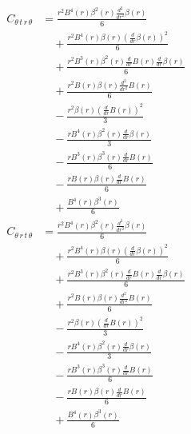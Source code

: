 \documentclass[11pt,a4paper]{article}
\begin{document}
\begin{align*}
  C_{\theta\,t\,r\,\theta} &= \frac{r^{2} B^{4}{\left(r \right)} \beta^{2}{\left(r \right)} \frac{d^{2}}{d r^{2}} \beta{\left(r \right)}}{6} \\
  &\quad + \frac{r^{2} B^{4}{\left(r \right)} \beta{\left(r \right)} \left(\frac{d}{d r} \beta{\left(r \right)}\right)^{2}}{6} \\
  &\quad + \frac{r^{2} B^{3}{\left(r \right)} \beta^{2}{\left(r \right)} \frac{d}{d r} B{\left(r \right)} \frac{d}{d r} \beta{\left(r \right)}}{6} \\
  &\quad + \frac{r^{2} B{\left(r \right)} \beta{\left(r \right)} \frac{d^{2}}{d r^{2}} B{\left(r \right)}}{6} \\
  &\quad - \frac{r^{2} \beta{\left(r \right)} \left(\frac{d}{d r} B{\left(r \right)}\right)^{2}}{3} \\
  &\quad - \frac{r B^{4}{\left(r \right)} \beta^{2}{\left(r \right)} \frac{d}{d r} \beta{\left(r \right)}}{3} \\
  &\quad - \frac{r B^{3}{\left(r \right)} \beta^{3}{\left(r \right)} \frac{d}{d r} B{\left(r \right)}}{6} \\
  &\quad - \frac{r B{\left(r \right)} \beta{\left(r \right)} \frac{d}{d r} B{\left(r \right)}}{6} \\
  &\quad + \frac{B^{4}{\left(r \right)} \beta^{3}{\left(r \right)}}{6}
\end{align*}
\begin{align*}
  C_{\theta\,r\,t\,\theta} &= \frac{r^{2} B^{4}{\left(r \right)} \beta^{2}{\left(r \right)} \frac{d^{2}}{d r^{2}} \beta{\left(r \right)}}{6} \\
  &\quad + \frac{r^{2} B^{4}{\left(r \right)} \beta{\left(r \right)} \left(\frac{d}{d r} \beta{\left(r \right)}\right)^{2}}{6} \\
  &\quad + \frac{r^{2} B^{3}{\left(r \right)} \beta^{2}{\left(r \right)} \frac{d}{d r} B{\left(r \right)} \frac{d}{d r} \beta{\left(r \right)}}{6} \\
  &\quad + \frac{r^{2} B{\left(r \right)} \beta{\left(r \right)} \frac{d^{2}}{d r^{2}} B{\left(r \right)}}{6} \\
  &\quad - \frac{r^{2} \beta{\left(r \right)} \left(\frac{d}{d r} B{\left(r \right)}\right)^{2}}{3} \\
  &\quad - \frac{r B^{4}{\left(r \right)} \beta^{2}{\left(r \right)} \frac{d}{d r} \beta{\left(r \right)}}{3} \\
  &\quad - \frac{r B^{3}{\left(r \right)} \beta^{3}{\left(r \right)} \frac{d}{d r} B{\left(r \right)}}{6} \\
  &\quad - \frac{r B{\left(r \right)} \beta{\left(r \right)} \frac{d}{d r} B{\left(r \right)}}{6} \\
  &\quad + \frac{B^{4}{\left(r \right)} \beta^{3}{\left(r \right)}}{6}
\end{align*}
\end{document}
